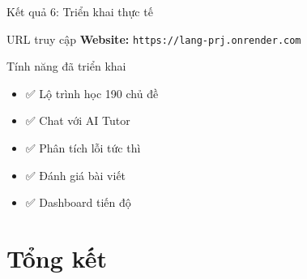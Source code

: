 \documentclass[notheorems,hyperref={bookmarks=true}]{beamer}
\begin{document}
\begin{frame}{Kết quả 6: Triển khai thực tế}
\begin{table}
    \centering
    \caption{Hệ thống được triển khai hoàn chỉnh}
\end{table}

\vspace{0.3cm}

\begin{exampleblock}{URL truy cập}
    \textbf{Website:} \texttt{https://lang-prj.onrender.com}
\end{exampleblock}

\begin{block}{Tính năng đã triển khai}
    \begin{itemize}
        \item ✅ Lộ trình học 190 chủ đề
        \item ✅ Chat với AI Tutor
        \item ✅ Phân tích lỗi tức thì
        \item ✅ Đánh giá bài viết
        \item ✅ Dashboard tiến độ
    \end{itemize}
\end{block}
\end{frame}

\section{Tổng kết}
\end{document}
